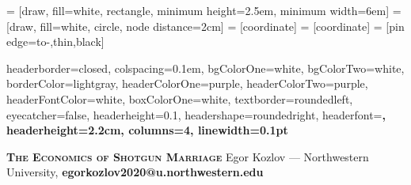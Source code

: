 \documentclass[landscape,a0paper,fontscale=0.285]{baposter} %
\begin{document}
	
	 = [draw, fill=white, rectangle, 
	minimum height=2.5em, minimum width=6em]
	 = [draw, fill=white, circle, node distance=2cm]
	 = [coordinate]
	 = [coordinate]
	 = [pin edge={to-,thin,black}]

\begin{poster}
{
headerborder=closed, %
colspacing=0.1em, %
bgColorOne=white, %
bgColorTwo=white, %
borderColor=lightgray, %
headerColorOne=purple, %
headerColorTwo=purple, %
headerFontColor=white, %
boxColorOne=white, %
textborder=roundedleft, %
eyecatcher=false, %
headerheight=0.1\textheight, %
headershape=roundedright, %
headerfont=\large\bf\textsc, %
headerheight=2.2cm,
columns=4,
linewidth=0.1pt %
}

{{\color{bleunuit}\LARGE\bf\textsc{The Economics of Shotgun Marriage}\vspace{0.3em}}} %
{{\color{bleunuit}\LARGE{Egor Kozlov  \hspace{2pt}---\hspace{2pt} Northwestern University, \textbf{egorkozlov2020@u.northwestern.edu}}}} %


\end{poster}
\end{document}
